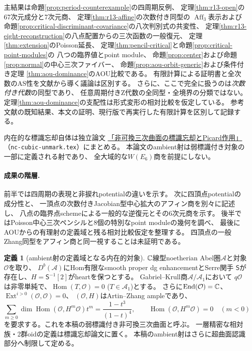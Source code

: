 \documentclass[11pt,a4paper]{ltjsarticle}
\theoremstyle{definition}\newtheorem{remark}[theorem]{注意}
\newtheorem{definition}[theorem]{定義}
\newcommand{\Ext}{\operatorname{Ext}}\newcommand{\Extop}{\operatorname{Ext}}
\newcommand{\Hom}{\operatorname{Hom}}\newcommand{\HH}{\operatorname{HH}}
\newcommand{\OO}{\mathcal O}\newcommand{\rank}{\operatorname{rank}}
\newcommand{\End}{\operatorname{End}}\newcommand{\RHom}{\operatorname{RHom}}
\begin{document}
主結果は命題\ref{prop:period-counterexample}の四周期反例、
定理\ref{thm:r13-open}の67次元成分と7次元商、
定理\ref{thm:r13-affine}の次数付き同型の
$\operatorname{Aff}_3$表示および命題\ref{prop:critical-discriminant-covariance}の八次判別式の共変性、
定理\ref{thm:r13-eight-reconstruction}の八点配置からの三次函数の一般復元、
定理\ref{thm:extension}のPoisson延長、
定理\ref{thm:pencil-critical}と命題\ref{prop:critical-point-modules}の
八つの臨界値とpoint module、
命題\ref{prop:center}および命題\ref{prop:normal}の中心三次ファイバー、
命題\ref{prop:aou-orbit-generic}および条件付き定理
\ref{thm:aou-dominance}のAOU比較である。
有限計算による証明書と全次数のAS性を文献から導く議論は区別する。
さらに、ここで完全に扱うのは\emph{次数付き代数}の同型であり、
任意周期付きZ代数の全同型・全境界の分類ではない。
定理\ref{thm:aou-dominance}の支配性は形式変形の相対比較を仮定している。
参考文献の既知結果、本文の証明、現行版で再実行した有限計算を区別して記録する。

内在的な標識忘却自体は独立論文
\href{https://github.com/uedakazushi/nc-cubic-unmark/blob/main/papers/nc-cubic-unmark.tex}
{「非可換三次曲面の標識忘却とPicard作用」}
（\texttt{nc-cubic-unmark.tex}）にまとめる。
本論文のambient射は弱標識付き対象の一部に定義される射であり、
全大域的な$W(E_6)$商を前提にしない。

\paragraph{成果の階層.}
前半では四周期の表現と非捩れpotentialの違いを示す。
次に四頂点potentialの成分性と、
一頂点の次数付きJacobian型中心拡大のアフィン商を別々に記述し、
八点の臨界点schemeによる一般的な逆復元とその6次元商を示す。
後半ではPoisson中心三次ペンシルと8個の特別なpoint moduleの幾何を調べ、
最後にAOUからの有理射の定義域と残る相対比較仮定を整理する。
四頂点の一般Zhang同型をアフィン商と同一視することは未証明である。

\begin{definition}[ambient射の定義域となる内在的対象]\label{def:weak-cubic}
$\mathbb C$線型noetherian Abel圏$\mathcal A$と対象$\OO$を取り、
$D^b(\mathcal A)$にHom有限なsmooth proper dg enhancementとSerre関手
$\mathsf S$が存在し、$H=\mathsf S^{-1}[2]$がheartを保つとする。
Gabriel--Krull商$\mathcal A/\mathcal A_1$において
$q\OO$は非零単純で、$\Hom(T,\OO)=0$ ($T\in\mathcal A_1$)とする。
さらに$\End(\OO)=\kk$、$\Ext^{i>0}(\OO,\OO)=0$、
$(\OO,H)$はArtin--Zhang ampleであり、
\[
 \sum_{m\ge0}\dim\Hom(\OO,H^m\OO)t^m
 =\frac{1-t^3}{(1-t)^4},\qquad
 \Hom(\OO,H^m\OO)=0\quad(m<0)
\]
を要求する。これを本稿の弱標識付き非可換三次曲面と呼ぶ。
一層精密な相対族・2群oidの定義は標識忘却論文に置く。
本稿のambient射はさらに超曲面認識部分へ制限して定める。
\end{definition}
\end{document}
